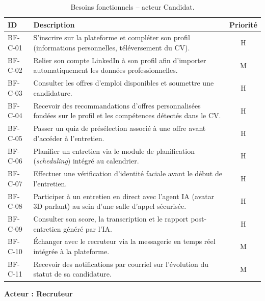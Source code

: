 \begin{table}[H]
  \centering
  \footnotesize
  \renewcommand{\arraystretch}{1.3}
  \begin{tabularx}{\textwidth}{|p{1.5cm}|X|c|}
    \hline
    \textbf{ID} & \textbf{Description} & \textbf{Priorité} \\
    \hline
    BF-C-01 & S'inscrire sur la plateforme et compléter son profil (informations personnelles, téléversement du CV). & H \\
    \hline
    BF-C-02 & Relier son compte LinkedIn à son profil afin d'importer automatiquement les données professionnelles. & M \\
    \hline
    BF-C-03 & Consulter les offres d'emploi disponibles et soumettre une candidature. & H \\
    \hline
    BF-C-04 & Recevoir des recommandations d'offres personnalisées fondées sur le profil et les compétences détectés dans le CV. & H \\
    \hline
    BF-C-05 & Passer un quiz de présélection associé à une offre avant d'accéder à l'entretien. & H \\
    \hline
    BF-C-06 & Planifier un entretien via le module de planification (\textit{scheduling}) intégré au calendrier. & H \\
    \hline
    BF-C-07 & Effectuer une vérification d'identité faciale avant le début de l'entretien. & H \\
    \hline
    BF-C-08 & Participer à un entretien en direct avec l'agent IA (avatar 3D parlant) au sein d'une salle d'appel sécurisée. & H \\
    \hline
    BF-C-09 & Consulter son score, la transcription et le rapport post-entretien généré par l'IA. & H \\
    \hline
    BF-C-10 & Échanger avec le recruteur via la messagerie en temps réel intégrée à la plateforme. & M \\
    \hline
    BF-C-11 & Recevoir des notifications par courriel sur l'évolution du statut de sa candidature. & M \\
    \hline
  \end{tabularx}
  \caption{Besoins fonctionnels -- acteur Candidat.}
  \label{tab:bf-candidat}
\end{table}

\bigskip
\noindent\textbf{Acteur : Recruteur}

